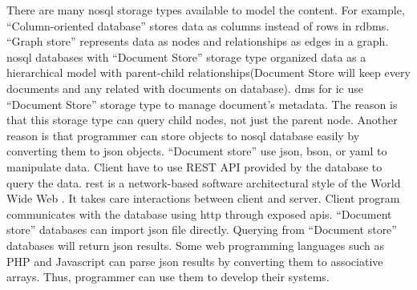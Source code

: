 There are many \gls{nosql} storage types available to model the content.
For example, \enquote{Column-oriented database} stores data as columns instead of rows in \gls{rdbms}.
\enquote{Graph store} represents data as nodes and relationships as edges in a graph.
\gls{nosql} databases with \enquote{Document Store} storage type organized data as a hierarchical model with parent-child relationships(Document Store will keep every documents and any related with documents on database).
\gls{dms} for \gls{ic} use \enquote{Document Store} storage type to manage document's metadata. %
The reason is that this storage type can query child nodes, not just the parent node.
Another reason is that programmer can store objects to \gls{nosql} database easily by converting them to \gls{json} objects.
\enquote{Document store} use \gls{json}, \gls{bson}, or \gls{yaml} to manipulate data.
Client have to use REST API provided by the database to query the data.
\gls{rest} is a network-based software architectural style of the World Wide Web \cite{doglio, masse_2012}.
It takes care interactions between client and server.
Client program communicates with the database using \gls{http} through exposed \glspl{api}.
\enquote{Document store} databases can import \gls{json} file directly.
Querying from \enquote{Document store} databases will return \gls{json} results.
Some web programming languages such as PHP and Javascript can parse \gls{json} results by converting them to associative arrays.
Thus, programmer can use them to develop their systems.



%

